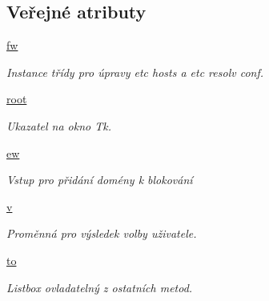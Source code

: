 \subsection*{Veřejné atributy}
\begin{DoxyCompactItemize}
\item 
\hypertarget{classmnEnDis_1_1App_a217656b4479c67c5c9307324200a36a0}{\hyperlink{classmnEnDis_1_1App_a217656b4479c67c5c9307324200a36a0}{fw}}\label{d3/d4e/classmnEnDis_1_1App_a217656b4479c67c5c9307324200a36a0}

\begin{DoxyCompactList}\small\item\em Instance třídy pro úpravy etc hosts a etc resolv conf. \end{DoxyCompactList}\item 
\hypertarget{classmnEnDis_1_1App_ace76e4f1ae369e83cd7f8f827b1615f6}{\hyperlink{classmnEnDis_1_1App_ace76e4f1ae369e83cd7f8f827b1615f6}{root}}\label{d3/d4e/classmnEnDis_1_1App_ace76e4f1ae369e83cd7f8f827b1615f6}

\begin{DoxyCompactList}\small\item\em Ukazatel na okno Tk. \end{DoxyCompactList}\item 
\hypertarget{classmnEnDis_1_1App_a410cba0728f165e5ee0a37f920fcd2ed}{\hyperlink{classmnEnDis_1_1App_a410cba0728f165e5ee0a37f920fcd2ed}{ew}}\label{d3/d4e/classmnEnDis_1_1App_a410cba0728f165e5ee0a37f920fcd2ed}

\begin{DoxyCompactList}\small\item\em Vstup pro přidání domény k blokování \end{DoxyCompactList}\item 
\hypertarget{classmnEnDis_1_1App_a02917859d52a16c3d7aa82bb4ae0bc7a}{\hyperlink{classmnEnDis_1_1App_a02917859d52a16c3d7aa82bb4ae0bc7a}{v}}\label{d3/d4e/classmnEnDis_1_1App_a02917859d52a16c3d7aa82bb4ae0bc7a}

\begin{DoxyCompactList}\small\item\em Proměnná pro výsledek volby uživatele. \end{DoxyCompactList}\item 
\hypertarget{classmnEnDis_1_1App_a105e2e7f503ad65d7885bcb55fce330e}{\hyperlink{classmnEnDis_1_1App_a105e2e7f503ad65d7885bcb55fce330e}{to}}\label{d3/d4e/classmnEnDis_1_1App_a105e2e7f503ad65d7885bcb55fce330e}

\begin{DoxyCompactList}\small\item\em Listbox ovladatelný z ostatních metod. \end{DoxyCompactList}\end{DoxyCompactItemize}


